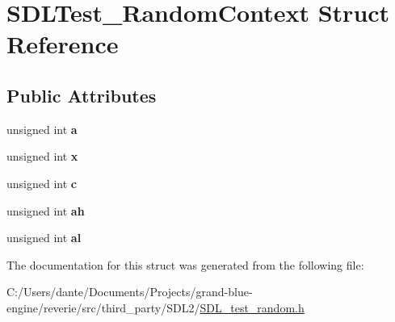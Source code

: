 \hypertarget{struct_s_d_l_test___random_context}{}\section{S\+D\+L\+Test\+\_\+\+Random\+Context Struct Reference}
\label{struct_s_d_l_test___random_context}
\subsection*{Public Attributes}
\begin{DoxyCompactItemize}
\item 
\mbox{\label{struct_s_d_l_test___random_context_a24f830d6cb476c96fbe325c99331e45f}} 
unsigned int {\bfseries a}
\item 
\mbox{\label{struct_s_d_l_test___random_context_a8bd6d1b4e1677ed1c06f5cc09f1af5b6}} 
unsigned int {\bfseries x}
\item 
\mbox{\label{struct_s_d_l_test___random_context_a17a6a7e7b68a33c67d9b74c8c7c33198}} 
unsigned int {\bfseries c}
\item 
\mbox{\label{struct_s_d_l_test___random_context_a2c8d2f1ee16cdfd38361b8f03b3fdb85}} 
unsigned int {\bfseries ah}
\item 
\mbox{\label{struct_s_d_l_test___random_context_a0e2bccd3611d383d6510c6c828aa54c4}} 
unsigned int {\bfseries al}
\end{DoxyCompactItemize}


The documentation for this struct was generated from the following file\+:\begin{DoxyCompactItemize}
\item 
C\+:/\+Users/dante/\+Documents/\+Projects/grand-\/blue-\/engine/reverie/src/third\+\_\+party/\+S\+D\+L2/\mbox{\hyperlink{_s_d_l__test__random_8h}{S\+D\+L\+\_\+test\+\_\+random.\+h}}\end{DoxyCompactItemize}
